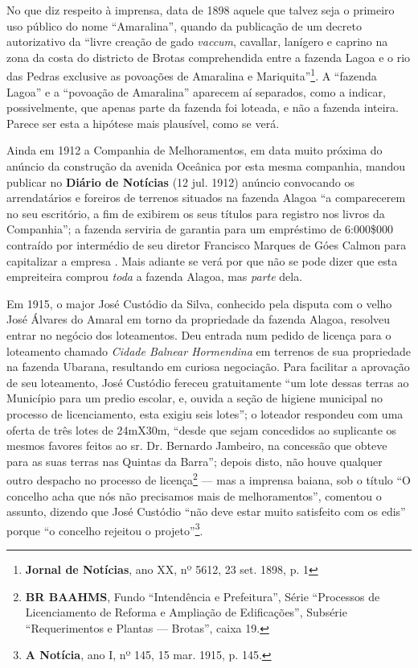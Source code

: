 No que diz respeito à imprensa, data de 1898 aquele que talvez seja o primeiro uso público do nome ``Amaralina'', quando da publicação de um decreto autorizativo da ``livre creação de gado \textit{vaccum}, cavallar,  lanígero e caprino na zona da costa do districto de Brotas comprehendida entre a fazenda Lagoa e o rio das Pedras exclusive as povoações de Amaralina e Mariquita''\footnote{\textbf{Jornal de Notícias}, ano XX, nº 5612, 23 set. 1898, p. 1}. A ``fazenda Lagoa'' e a ``povoação de Amaralina'' aparecem aí separados, como a indicar, possivelmente, que apenas parte da fazenda foi loteada, e não a fazenda inteira. Parece ser esta a hipótese mais plausível, como se verá. 

Ainda em 1912 a Companhia de Melhoramentos, em data muito próxima do anúncio da construção da avenida Oceânica por esta mesma companhia, mandou publicar no \textbf{Diário de Notícias} (12 jul. 1912) anúncio convocando os arrendatários e foreiros de terrenos situados na fazenda Alagoa ``a comparecerem no seu escritório, a fim de exibirem os seus títulos para registro nos livros da Companhia''; a fazenda serviria de garantia para um empréstimo de 6:000\$000 contraído por intermédio de seu diretor Francisco Marques de Góes Calmon para capitalizar a empresa \cite[p.~123]{CUNHA2011}. Mais adiante se verá por que não se pode dizer que esta empreiteira comprou \textit{toda} a fazenda Alagoa, mas \textit{parte} dela.

Em 1915, o major José Custódio da Silva, conhecido pela disputa com o velho José Álvares do Amaral em torno da propriedade da fazenda Alagoa, resolveu entrar no negócio dos loteamentos.  Deu entrada num pedido de licença para o loteamento chamado \textit{Cidade Balnear Hormendina} em terrenos de sua propriedade na fazenda Ubarana, resultando em curiosa negociação. Para facilitar a aprovação de seu loteamento, José Custódio fereceu gratuitamente ``um lote dessas terras ao Município para um predio escolar, e, ouvida a seção de higiene municipal no processo de licenciamento, esta exigiu seis lotes''; o loteador respondeu com uma oferta de três lotes de 24mX30m, ``desde que sejam concedidos ao suplicante os mesmos favores feitos ao sr. Dr. Bernardo Jambeiro, na concessão que obteve para as suas terras nas Quintas da Barra''; depois disto, não houve qualquer outro despacho no processo de licença\footnote{\textbf{BR BAAHMS}, Fundo ``Intendência e Prefeitura'', Série ``Processos de Licenciamento de Reforma e Ampliação de Edificações'', Subsérie ``Requerimentos e Plantas --- Brotas'', caixa 19.} --- mas a imprensa baiana, sob o título ``O concelho acha que nós não precisamos mais de melhoramentos'', comentou o assunto, dizendo que José Custódio ``não deve estar muito satisfeito com os edis'' porque ``o concelho rejeitou o projeto''\footnote{\textbf{A Notícia}, ano I, nº 145, 15 mar. 1915, p. 145.}.

